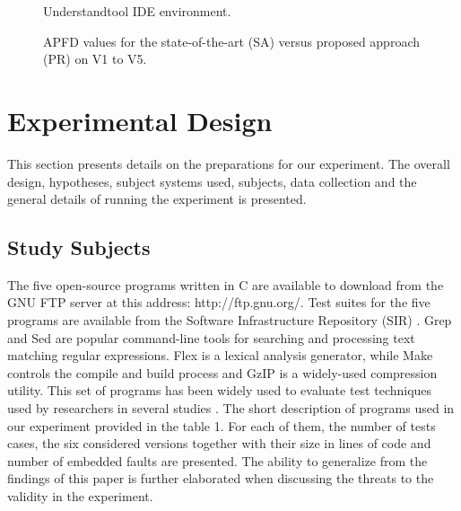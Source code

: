 \documentclass{sig-alternate}
\begin{document}
\begin{comment}
\subsection{Figures}

\begin{figure}
\centering
\epsfig{file=fly.eps}
\caption{A sample black and white graphic (.eps format).}
\end{figure}
\end{comment}
\begin{figure}
\centering
{}
\caption{Understand\texttrademark tool IDE environment.}
\end{figure}

\begin{figure*}
\centering
{}
\caption{APFD values for the state-of-the-art (SA) versus proposed approach (PR) on V1 to V5.}

\end{figure*}


\section{Experimental Design}
This section presents details on the preparations for our experiment. The overall design, hypotheses, subject systems used, subjects, data collection and the
general details of running the experiment is presented.

\subsection{Study Subjects}
The five open-source programs \cite{henard:comparing} written in C are available to download from the GNU FTP server at this address: http://ftp.gnu.org/. Test suites for the five programs are available from the Software Infrastructure Repository (SIR) \cite{do:supporting}. Grep and Sed are popular command-line tools for searching and processing text matching regular expressions. Flex is a lexical analysis generator, while Make controls the compile and build process and GzIP is a widely-used compression utility. This set of programs has been widely used to evaluate test techniques used by researchers in several studies \cite{henard:comparing}. The short description of programs used in our experiment provided in the table 1. For each of them, the number of tests cases, the six considered versions together with their size in lines of code and number of embedded faults are presented. The ability to generalize from the findings of this paper is further elaborated when discussing the threats to the validity in the experiment.
\end{document}
